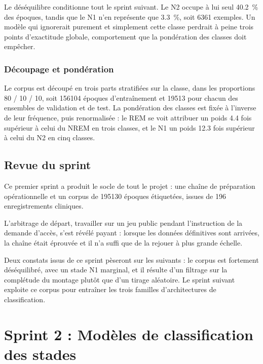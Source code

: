 Le déséquilibre conditionne tout le sprint suivant. Le N2 occupe à lui
seul \SI{40,2}{\percent} des époques, tandis que le N1 n'en représente que
\SI{3,3}{\percent}, soit \num{6361} exemples. Un modèle qui ignorerait purement et
simplement cette classe perdrait à peine trois points d'exactitude globale, comportement
que la pondération des classes doit empêcher.

\subsubsection{Découpage et pondération}

Le corpus est découpé en trois parts stratifiées sur la classe, dans les proportions
\num{80} / \num{10} / \num{10}, soit \num{156104} époques d'entraînement et \num{19513}
pour chacun des ensembles de validation et de test. La pondération des classes est fixée
à l'inverse de leur fréquence, puis renormalisée : le REM se voit attribuer un poids
\num{4,4} fois supérieur à celui du NREM en trois classes, et le N1 un poids \num{12,3}
fois supérieur à celui du N2 en cinq classes.

\subsection{Revue du sprint}

Ce premier sprint a produit le socle de tout le projet : une chaîne de préparation
opérationnelle et un corpus de \num{195130} époques étiquetées, issues de 196
enregistrements cliniques.

L'arbitrage de départ, travailler sur un jeu public pendant l'instruction de la
demande d'accès, s'est révélé payant : lorsque les données définitives sont arrivées,
la chaîne était éprouvée et il n'a suffi que de la rejouer à plus grande échelle.

Deux constats issus de ce sprint pèseront sur les suivants : le corpus est fortement
déséquilibré, avec un stade N1 marginal, et il résulte d'un filtrage sur la complétude
du montage plutôt que d'un tirage aléatoire. Le sprint suivant exploite ce corpus pour
entraîner les trois familles d'architectures de classification.

\section{Sprint 2 : Modèles de classification des stades}
\label{sec:sprint2}

